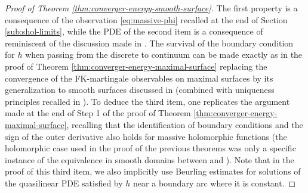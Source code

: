 \documentclass[reqno]{amsart}
\numberwithin{equation}{section}
\theoremstyle{definition}
\theoremstyle{remark}
\begin{document}
\begin{proof}[Proof of Theorem \ref{thm:converger-energy-smooth-surface}]
The first property is a consequence of the observation \eqref{eq:massive-phi} recalled at the end of Section \ref{sub:shol-limits}, while the PDE of the second item is a consequence of \cite[(6.1.12)]{park2025near} reminiscent of the discussion made in  \cite[Section 3.2]{park-iso}. The survival of the boundary condition for $h$ when passing from the discrete to continuum can be made exactly as in the proof of Theorem \ref{thm:converger-energy-maximal-surface} replacing the convergence of the FK-martingale observables on maximal surfaces by its generalization to smooth surfaces discussed in \cite[Remark 1.4]{Par25} (combined with uniqueness principles recalled in \cite[Section 5.2]{park-iso}). To deduce the third item, one replicates the argument made at the end of Step 1 of the proof of Theorem \ref{thm:converger-energy-maximal-surface}, recalling that the identification of boundary conditions and the sign of the outer derivative also holds for massive holomorphic functions (the holomorphic case used in the proof of the previous theorems was only a specific instance of the equivalence in smooth domains between \cite[Section 6.2]{WanPHD} and \cite[Section 6]{park2025near}). Note that in the proof of this third item, we also implicitly use Beurling estimates for solutions of the quasilinear PDE satisfied by $h$ near a boundary arc where it is constant.


\end{proof}
\end{document}
